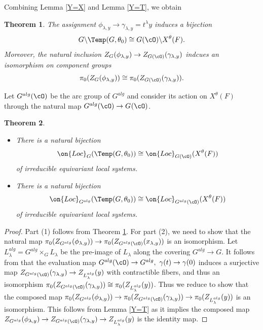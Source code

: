 \documentclass[12pt]{amsart}
\newtheorem{thm}{Theorem}
\theoremstyle{remark}
\begin{document}
Combining Lemma \ref{Y=X} and Lemma \ref{Y=T}, we obtain

\begin{thm}\label{T=X}
    The assignment $\phi_{\lambda,y}\to \gamma_{\lambda,y}=t^\lambda y$
    induces a bijection
    \[ G\backslash\Temp(G,\theta_0)\cong G(\cO)\backslash X^\theta(F).\]
    Moreover, the natural inclusion 
    $Z_G(\phi_{\lambda,y})\to Z_{G(\cO)}(\gamma_{\lambda,y})$ indcues an isomorphism on component groups
    \[\pi_0(Z_G(\phi_{\lambda,y}))\cong \pi_0(Z_{G(\cO)}(\gamma_{\lambda,y})).\]
\end{thm}


Let $G^{alg}(\cO)$ be the arc group of $G^{alg}$ and consider its action on $X^{\theta}(F)$ through the natural map $G^{alg}(\cO)\to G^{}(\cO)$.

\begin{thm}\label{T=X enhanced}
\begin{itemize}
    \item [(1)]
    There is a natural bijection
  \[\on{Loc}_G(\Temp(G,\theta_0))\cong \on{Loc}_{G(\cO)}(X^\theta(F))\]
of irreducible equivariant local systems.
    \item [(2)]
    There is a natural bijection
\[\on{Loc}_{G^{alg}}(\Temp(G,\theta_0))\cong \on{Loc}_{G^{alg}(\cO)}(X^\theta(F))\]
of irreducible equivariant local systems.
\end{itemize}
\end{thm}
\begin{proof}
Part (1) follows from Theorem \ref{T=X}.
For part (2), we need to show that 
the natural map $\pi_0(Z_{G^{alg}}(\phi_{\lambda,y}))\to \pi_0(Z_{G^{alg}(\cO)}(x_{\lambda,y}))$ is an isomorphism.
Let $L_\lambda^{alg}=G^{alg}\times_GL_\lambda$
be the pre-image of $L_\lambda$ along the covering $G^{alg}\to G$.
It follows from \cite[Theorem 13]{CY} that 
the evaluation map $G^{alg}(\cO)\to G^{alg},\ \gamma(t)\to\gamma(0)$
induces a surjective map $Z_{G^{alg}(\cO)}(\gamma_{\lambda,y})\to
Z_{L_\lambda^{alg}}(y)$ with contractible fibers, and thus an isomorphism $\pi_0(Z_{G^{alg}(\cO)}(\gamma_{\lambda,y}))\cong \pi_0(Z_{L_\lambda^{alg}}(y))$.
Thus we reduce to show that the composed map 
$\pi_0(Z_{G^{alg}}(\phi_{\lambda,y}))\to \pi_0(Z_{G^{alg}(\cO)}(\gamma_{\lambda,y}))\to \pi_0(Z_{L_\lambda^{alg}}(y))$ is an isomorphism.
This follows from Lemma \ref{Y=T} as it implies the composed map
$Z_{G^{alg}}(\phi_{\lambda,y})\to Z_{G^{alg}(\cO)}(\gamma_{\lambda,y})\to  Z_{L_\lambda^{alg}}(y)$
is the identity map.
\end{proof}
\end{document}
